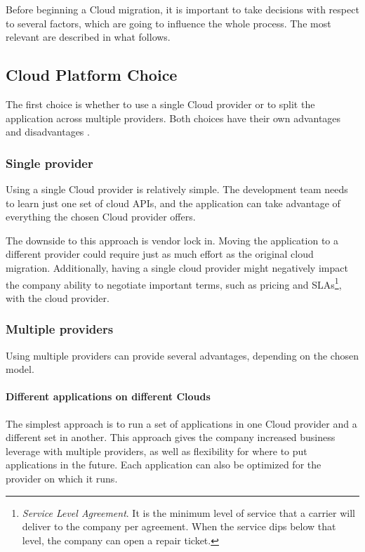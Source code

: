 
Before beginning a Cloud migration, it is important to take decisions with respect to several factors, which are going to influence the whole process.
The most relevant are described in what follows.

\subsection{Cloud Platform Choice}
    The first choice is whether to use a single Cloud provider or to split the application across multiple providers.
    Both choices have their own advantages and disadvantages \cite{bib:related_work:migration:10_steps}.
    
    \subsubsection{Single provider}
        Using a single Cloud provider is relatively simple.
        The development team needs to learn just one set of cloud APIs, and the application can take advantage of everything the chosen Cloud provider offers.

        The downside to this approach is vendor lock in.
        Moving the application to a different provider could require just as much effort as the original cloud migration.
        Additionally, having a single cloud provider might negatively impact the company ability to negotiate important terms, such as pricing and SLAs\footnote{
            \textit{Service Level Agreement}.
             It is the minimum level of service that a carrier will deliver to the company per agreement.
             When the service dips below that level, the company can open a repair ticket.
        }, with the cloud provider.
    
    \subsubsection{Multiple providers}
        Using multiple providers can provide several advantages, depending on the chosen model.
        
        \paragraph{Different applications on different Clouds}
            The simplest approach is to run a set of applications in one Cloud provider and a different set in another.
            This approach gives the company increased business leverage with multiple providers, as well as flexibility for where to put applications in the future.
            Each application can also be optimized for the provider on which it runs.
            
